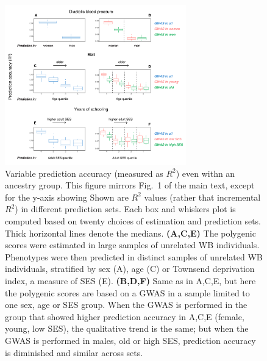 \documentclass[hidelinks, 12pt]{article}
\begin{document}
\begin{figure}[!h]
\label{fig:prediction_accuracy_strata_r2_including_covariates}
\centering
\includegraphics[width=0.7\textwidth]{supp_figures/supp_raw_R2_to_env_boxplot_nice.pdf}
\caption[Variable prediction accuracy (measured as R2) even withn an ancestry group.]{\small Variable prediction accuracy (measured as $R^2$) even withn an ancestry group.  This figure mirrors Fig.~1 of the main text, except for the y-axis showing Shown are $R^2$ values (rather that incremental $R^2$) in different prediction sets. Each box and whiskers plot is computed based on twenty choices of estimation and prediction sets. Thick horizontal lines denote the medians.  {\bf (A,C,E)} The polygenic scores were estimated in large samples of unrelated WB individuals. Phenotypes were then predicted in distinct samples of unrelated WB individuals, stratified by sex (A), age (C) or Townsend deprivation index, a measure of SES (E).  {\bf (B,D,F)} Same as in A,C,E, but here the polygenic scores are based on a GWAS in a sample limited to one sex, age or SES group.  When the GWAS is performed in the group that showed higher prediction accuracy in A,C,E (female, young, low SES), the qualitative trend is the same; but when the GWAS is performed in males, old or high SES, prediction accuracy is diminished and similar across sets.}
\end{figure}
\end{document}
